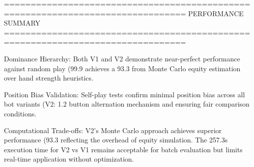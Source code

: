 ================================================================================
PERFORMANCE SUMMARY
================================================================================

Dominance Hierarchy: Both V1 and V2 demonstrate near-perfect performance against
random play (99.9%
achieves a 93.3%
from Monte Carlo equity estimation over hand strength heuristics.

Position Bias Validation: Self-play tests confirm minimal position bias across all
bot variants (V2: 1.2%
button alternation mechanism and ensuring fair comparison conditions.

Computational Trade-offs: V2's Monte Carlo approach achieves superior performance
(93.3%
reflecting the overhead of equity simulation. The 257.3s execution time for V2 vs V1
remains acceptable for batch evaluation but limits real-time application without
optimization.
